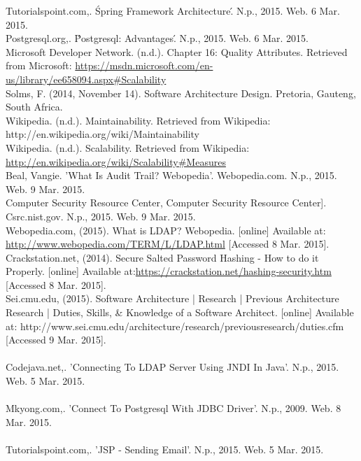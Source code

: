 Tutorialspoint.com,. \'Spring Framework Architecture\'. N.p., 2015. Web. 6 Mar. 2015. \\

Postgresql.org,. \'Postgresql: Advantages\'. N.p., 2015. Web. 6 Mar. 2015.\\

Microsoft Developer Network. (n.d.). Chapter 16: Quality Attributes. Retrieved from Microsoft: \url{https://msdn.microsoft.com/en-us/library/ee658094.aspx#Scalability}\\

Solms, F. (2014, November 14). Software Architecture Design. Pretoria, Gauteng, South Africa.\\

Wikipedia. (n.d.). Maintainability. Retrieved from Wikipedia: http://en.wikipedia.org/wiki/Maintainability\\

Wikipedia. (n.d.). Scalability. Retrieved from Wikipedia: \url{http://en.wikipedia.org/wiki/Scalability#Measures}\\

Beal, Vangie. 'What Is Audit Trail? Webopedia'. Webopedia.com. N.p., 2015. Web. 9 Mar. 2015.\\

Computer Security Resource Center, Computer Security Resource Center]. Csrc.nist.gov. N.p., 2015. Web. 9 Mar. 2015.\\

Webopedia.com, (2015). What is LDAP? Webopedia. [online] Available at: \url{http://www.webopedia.com/TERM/L/LDAP.html} [Accessed 8 Mar. 2015].\\

Crackstation.net, (2014). Secure Salted Password Hashing - How to do it Properly. [online] Available at:\url{https://crackstation.net/hashing-security.htm} [Accessed 8 Mar. 2015].\\

Sei.cmu.edu, (2015). Software Architecture | Research | Previous Architecture Research | Duties, Skills, \& Knowledge of a Software Architect. [online] Available at: http://www.sei.cmu.edu/architecture/research/previousresearch/duties.cfm [Accessed 9 Mar. 2015]. \\
\\
Codejava.net,. 'Connecting To LDAP Server Using JNDI In Java'. N.p., 2015. Web. 5 Mar. 2015.\\
\\
Mkyong.com,. 'Connect To Postgresql With JDBC Driver'. N.p., 2009. Web. 8 Mar. 2015.\\
\\
Tutorialspoint.com,. 'JSP - Sending Email'. N.p., 2015. Web. 5 Mar. 2015.\\


